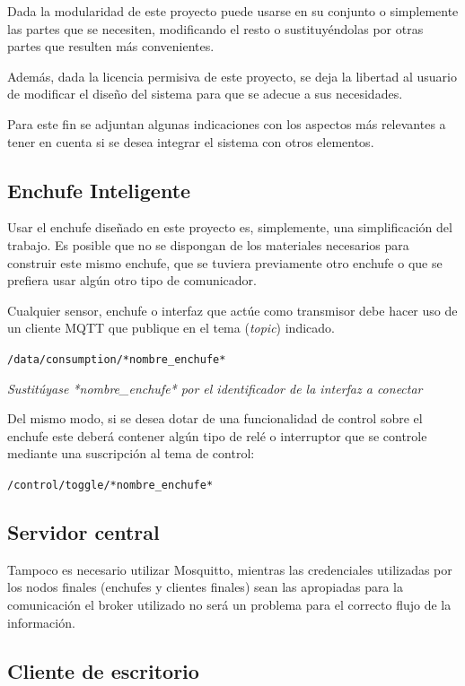 \documentclass[a4paper,10pt]{article}
\begin{document}
Dada la modularidad de este proyecto puede usarse en su
conjunto o simplemente las partes que se necesiten, modificando el
resto o sustituyéndolas por otras partes que resulten más
convenientes.

Además, dada la licencia permisiva de este proyecto, se deja la
libertad al usuario de modificar el diseño del sistema para que se
adecue a sus necesidades.

Para este fin se adjuntan algunas indicaciones con los aspectos más
relevantes a tener en cuenta si se desea integrar el sistema con otros
elementos.

\subsection{Enchufe Inteligente}

Usar el enchufe diseñado en este proyecto es, simplemente, una
simplificación del trabajo. Es posible que no se dispongan de los
materiales necesarios para construir este mismo enchufe, que se
tuviera previamente otro enchufe o que se prefiera usar algún otro
tipo de comunicador.

Cualquier sensor, enchufe o interfaz que actúe como transmisor debe
hacer uso de un cliente MQTT que publique en el tema (\textit{topic})
indicado.

\texttt{/data/consumption/*nombre\_enchufe*}

\textit{Sustitúyase *nombre\_enchufe* por el identificador de la
  interfaz a conectar}

Del mismo modo, si se desea dotar de una funcionalidad de control
sobre el enchufe este deberá contener algún tipo de relé o interruptor
que se controle mediante una suscripción al tema de control:

\texttt{/control/toggle/*nombre\_enchufe*}

\subsection{Servidor central}

Tampoco es necesario utilizar Mosquitto, mientras las credenciales
utilizadas por los nodos finales (enchufes y clientes finales) sean
las apropiadas para la comunicación el broker utilizado no será un
problema para el correcto flujo de la información.

\subsection{Cliente de escritorio}
\end{document}
